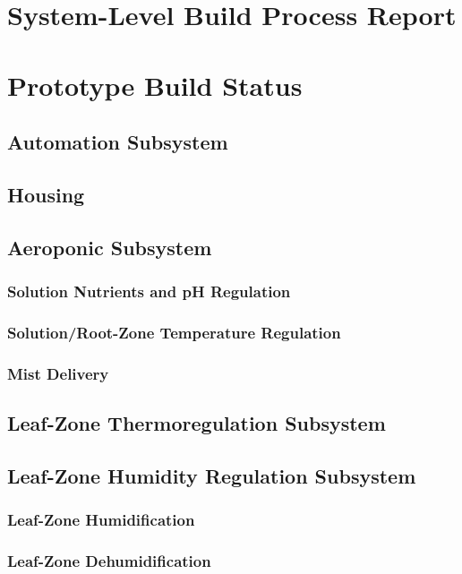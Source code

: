 \documentclass{../tex/report}
\begin{document}
\section{System-Level Build Process Report}



\section{Prototype Build Status}
\subsection{Automation Subsystem}
\subsection{Housing}
\subsection{Aeroponic Subsystem}
\subsubsection{Solution Nutrients and pH Regulation}
\subsubsection{Solution/Root-Zone Temperature Regulation}
\subsubsection{Mist Delivery}
\subsection{Leaf-Zone Thermoregulation Subsystem}
\subsection{Leaf-Zone Humidity Regulation Subsystem}
\subsubsection{Leaf-Zone Humidification}
\subsubsection{Leaf-Zone Dehumidification}
\end{document}
